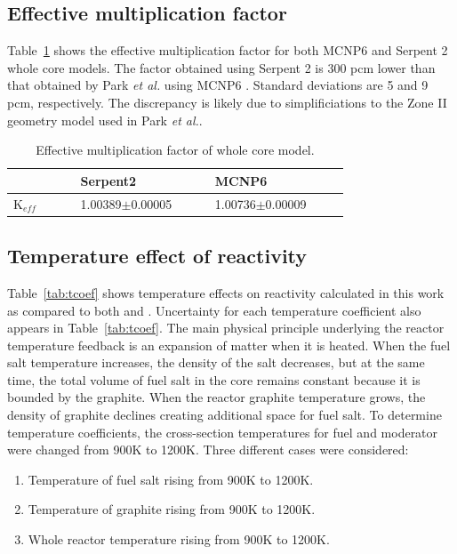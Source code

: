 \documentclass{anstrans}
\begin{document}
\subsection{Effective multiplication factor}
Table~\ref{tab:keff} shows the effective multiplication factor for both MCNP6 
and Serpent 2 whole core models. The factor obtained using Serpent 2 is 300 pcm 
lower than that obtained by Park \emph{et al.} using MCNP6 
\cite{park_whole_2015}. Standard deviations are 5 and 9 pcm, respectively. The 
discrepancy is likely due to simplificiations to the Zone II geometry model 
used in Park \emph{et al.}.
\captionsetup[table]{
  labelsep = newline,
  name = TABLE, justification=justified,
  singlelinecheck=false,%
  labelsep=colon,%
  skip = \medskipamount}
\begin{table}[h!]
\caption{Effective multiplication factor of whole core model.}
\begin{tabular}{p{0.15\linewidth} p{0.3\linewidth} p{0.3\linewidth}} \toprule
      & Serpent2      & MCNP6 \cite{park_whole_2015}          \\ \midrule
K$_{eff}$  & 1.00389$\pm$0.00005 & 1.00736$\pm$0.00009
\\
\bottomrule
\end{tabular}
  \label{tab:keff}
\end{table}
\subsection{Temperature effect of reactivity}
Table~\ref{tab:tcoef} shows temperature effects on reactivity calculated in 
this work as compared to both \cite{park_whole_2015} and 
\cite{robertson_conceptual_1971}. Uncertainty for each temperature coefficient 
also appears in Table~\ref{tab:tcoef}. The main physical principle underlying 
the reactor temperature feedback is an expansion of matter when it is heated.  
When the fuel salt temperature increases, the density of the salt decreases, 
but at the same time, the total volume of fuel salt in the core remains 
constant because it is bounded by the graphite. When the reactor graphite 
temperature grows, the density of graphite declines creating additional space 
for fuel salt. To determine temperature coefficients, the cross-section 
temperatures for fuel and moderator were changed from 900K to 1200K. Three 
different cases were considered:
\begin{enumerate}  \item Temperature of fuel salt rising from 900K to 1200K.
\item Temperature of graphite rising from 900K to 1200K.  \item Whole reactor 
        temperature rising from 900K to 1200K.
\end{enumerate}
\end{document}
